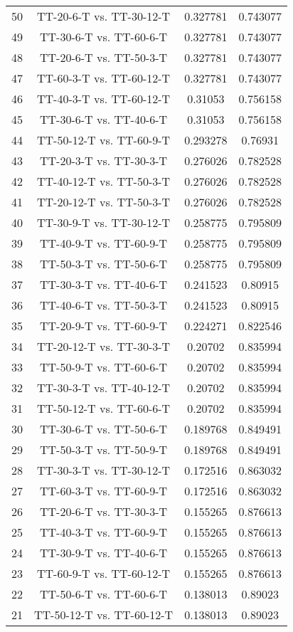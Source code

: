 \documentclass[a4paper,10pt]{article}
\begin{document}
\begin{landscape}
\begin{table}[!htp]
\begin{tabular}{cccc}
50&TT-20-6-T vs. TT-30-12-T&0.327781&0.743077\\
49&TT-30-6-T vs. TT-60-6-T&0.327781&0.743077\\
48&TT-20-6-T vs. TT-50-3-T&0.327781&0.743077\\
47&TT-60-3-T vs. TT-60-12-T&0.327781&0.743077\\
46&TT-40-3-T vs. TT-60-12-T&0.31053&0.756158\\
45&TT-30-6-T vs. TT-40-6-T&0.31053&0.756158\\
44&TT-50-12-T vs. TT-60-9-T&0.293278&0.76931\\
43&TT-20-3-T vs. TT-30-3-T&0.276026&0.782528\\
42&TT-40-12-T vs. TT-50-3-T&0.276026&0.782528\\
41&TT-20-12-T vs. TT-50-3-T&0.276026&0.782528\\
40&TT-30-9-T vs. TT-30-12-T&0.258775&0.795809\\
39&TT-40-9-T vs. TT-60-9-T&0.258775&0.795809\\
38&TT-50-3-T vs. TT-50-6-T&0.258775&0.795809\\
37&TT-30-3-T vs. TT-40-6-T&0.241523&0.80915\\
36&TT-40-6-T vs. TT-50-3-T&0.241523&0.80915\\
35&TT-20-9-T vs. TT-60-9-T&0.224271&0.822546\\
34&TT-20-12-T vs. TT-30-3-T&0.20702&0.835994\\
33&TT-50-9-T vs. TT-60-6-T&0.20702&0.835994\\
32&TT-30-3-T vs. TT-40-12-T&0.20702&0.835994\\
31&TT-50-12-T vs. TT-60-6-T&0.20702&0.835994\\
30&TT-30-6-T vs. TT-50-6-T&0.189768&0.849491\\
29&TT-50-3-T vs. TT-50-9-T&0.189768&0.849491\\
28&TT-30-3-T vs. TT-30-12-T&0.172516&0.863032\\
27&TT-60-3-T vs. TT-60-9-T&0.172516&0.863032\\
26&TT-20-6-T vs. TT-30-3-T&0.155265&0.876613\\
25&TT-40-3-T vs. TT-60-9-T&0.155265&0.876613\\
24&TT-30-9-T vs. TT-40-6-T&0.155265&0.876613\\
23&TT-60-9-T vs. TT-60-12-T&0.155265&0.876613\\
22&TT-50-6-T vs. TT-60-6-T&0.138013&0.89023\\
21&TT-50-12-T vs. TT-60-12-T&0.138013&0.89023\\

\end{tabular}
\end{table}
\end{landscape}
\end{document}
